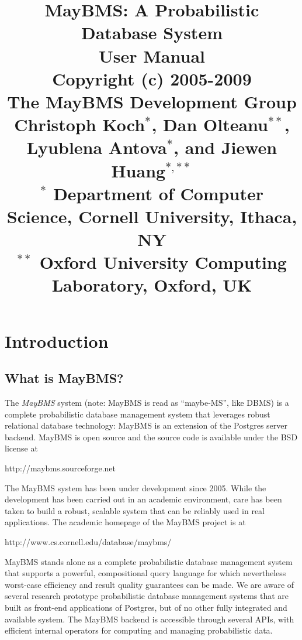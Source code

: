 \documentclass[12pt]{book}
\title{MayBMS: A Probabilistic Database System \\[3ex]
User Manual
\\[6ex]
{\small Copyright (c) 2005-2009 \\
The MayBMS Development Group
\\[6ex]
Christoph Koch$^*$, Dan Olteanu$^{**}$, Lyublena Antova$^{*}$, and
Jiewen Huang$^{*,**}$ \\[4ex]
$^*$ Department of Computer Science,
Cornell University, Ithaca, NY \\[1ex]
$^{**}$ Oxford University Computing Laboratory, Oxford, UK}}
\author{}
\date{}
\begin{document}
\maketitle

\tableofcontents

 
\chapter{Introduction}


\section{What is MayBMS?}


The {\em MayBMS}\/ system (note: MayBMS is read as ``maybe-MS'', like DBMS)
is a complete
probabilistic database management system that leverages robust
relational database technology:
MayBMS is an extension of the Postgres server backend.
MayBMS is open source and the source code
is available under the BSD license at
%
\begin{center}
http://maybms.sourceforge.net
\end{center}


The MayBMS system has been under development since 2005.
While the development has been carried out in an academic environment,
care has been taken to build a robust, scalable system that can be
reliably used in real applications.
%
The academic homepage of the MayBMS project is at

\begin{center}
http://www.cs.cornell.edu/database/maybms/
\end{center}



MayBMS stands alone as a complete probabilistic database management system
that supports a powerful, compositional query language for which nevertheless worst-case efficiency and result quality guarantees can be made.
We are aware of several research prototype probabilistic database management systems that are built as front-end applications of Postgres, but of no other fully integrated and available system. The MayBMS backend is accessible through several APIs, with efficient internal operators for computing and managing probabilistic data.
\end{document}

